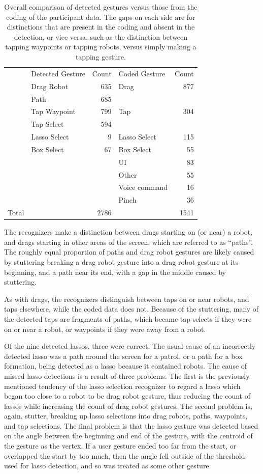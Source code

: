 \begin{table}
	\centering
	\begin{tabular}{l l r | l r}
		&Detected Gesture & Count & Coded Gesture & Count\\
		&Drag Robot & 635 & Drag & 877 \\
		&Path & 685 & & \\ 
		&Tap Waypoint & 799 & Tap & 304 \\
		&Tap Select & 594 & & \\
		&Lasso Select & 9 & Lasso Select & 115\\
		&Box Select & 67 & Box Select & 55 \\
		& & & UI & 83\\
		& & & Other & 55\\
		& & & Voice command & 16\\
		& & & Pinch & 36\\
		Total & & 2786 & & 1541\\				
	\end{tabular}
	\caption{Overall comparison of detected gestures versus those from the coding of the participant data. The gaps on each side are for distinctions that are present in the coding and absent in the detection, or vice versa, such as the distinction between tapping waypoints or tapping robots, versus simply making a tapping gesture. }\label{tab:recognized_vs_coded}
\end{table}

The recognizers make a distinction between drags starting on (or near) a robot, and drags starting in other areas of the screen, which are referred to as ``paths''. 
The roughly equal proportion of paths and drag robot gestures are likely caused by stuttering breaking a drag robot gesture into a drag robot gesture at its beginning, and a path near its end, with a gap in the middle caused by stuttering. 

As with drags, the recognizers distinguish between taps on or near robots, and taps elsewhere, while the coded data does not. 
Because of the stuttering, many of the detected taps are fragments of paths, which became tap selects if they were on or near a robot, or waypoints if they were away from a robot. 

Of the nine detected lassos, three were correct. 
The usual cause of an incorrectly detected lasso was a path around the screen for a patrol, or a path for a box formation, being detected as a lasso because it contained robots. 
The cause of missed lasso detections is a result of three problems.
The first is the previously mentioned tendency of the lasso selection recognizer to regard a lasso which began too close to a robot to be drag robot gesture, thus reducing the count of lassos while increasing the count of drag robot gestures. 
The second problem is, again, stutter, breaking up lasso selections into drag robots, paths, waypoints, and tap selections.
The final problem is that the lasso gesture was detected based on the angle between the beginning and end of the gesture, with the centroid of the gesture as the vertex. 
If a user gesture ended too far from the start, or overlapped the start by too much, then the angle fell outside of the threshold used for lasso detection, and so was treated as some other gesture. 

